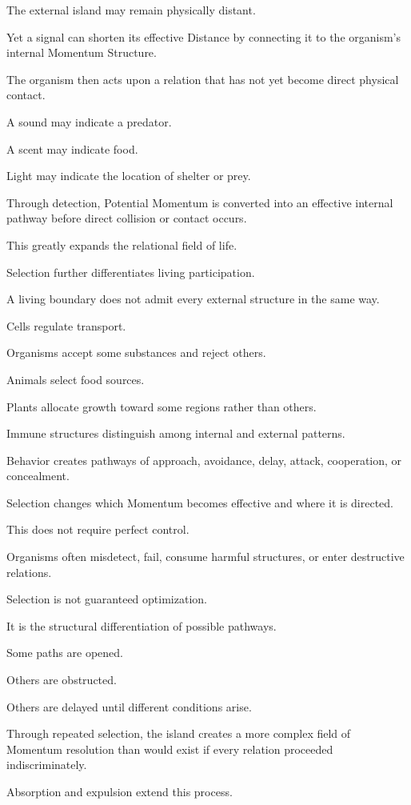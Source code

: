 The external island may remain physically distant.

Yet a signal can shorten its effective Distance by connecting it to the organism’s internal Momentum Structure.

The organism then acts upon a relation that has not yet become direct physical contact.

A sound may indicate a predator.

A scent may indicate food.

Light may indicate the location of shelter or prey.

Through detection, Potential Momentum is converted into an effective internal pathway before direct collision or contact occurs.

This greatly expands the relational field of life.

Selection further differentiates living participation.

A living boundary does not admit every external structure in the same way.

Cells regulate transport.

Organisms accept some substances and reject others.

Animals select food sources.

Plants allocate growth toward some regions rather than others.

Immune structures distinguish among internal and external patterns.

Behavior creates pathways of approach, avoidance, delay, attack, cooperation, or concealment.

Selection changes which Momentum becomes effective and where it is directed.

This does not require perfect control.

Organisms often misdetect, fail, consume harmful structures, or enter destructive relations.

Selection is not guaranteed optimization.

It is the structural differentiation of possible pathways.

Some paths are opened.

Others are obstructed.

Others are delayed until different conditions arise.

Through repeated selection, the island creates a more complex field of Momentum resolution than would exist if every relation proceeded indiscriminately.

Absorption and expulsion extend this process.


